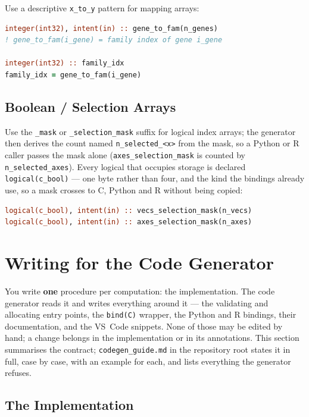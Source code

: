\documentclass{article}
\begin{document}
Use a descriptive \texttt{x\_to\_y} pattern for mapping arrays:

\begin{lstlisting}[language=Fortran]
integer(int32), intent(in) :: gene_to_fam(n_genes)
! gene_to_fam(i_gene) = family index of gene i_gene

integer(int32) :: family_idx
family_idx = gene_to_fam(i_gene)
\end{lstlisting}

\subsection{Boolean / Selection Arrays}

Use the \texttt{\_mask} or \texttt{\_selection\_mask} suffix for logical index arrays; the
generator then derives the count named \texttt{n\_selected\_<x>} from the mask, so a Python or R
caller passes the mask alone (\texttt{axes\_selection\_mask} is counted by
\texttt{n\_selected\_axes}). Every logical
that occupies storage is declared \texttt{logical(c\_bool)} --- one byte rather than four, and
the kind the bindings already use, so a mask crosses to C, Python and R without being copied:

\begin{lstlisting}[language=Fortran]
logical(c_bool), intent(in) :: vecs_selection_mask(n_vecs)
logical(c_bool), intent(in) :: axes_selection_mask(n_axes)
\end{lstlisting}

\section{Writing for the Code Generator}

You write \textbf{one} procedure per computation: the implementation. The code generator reads it
and writes everything around it — the validating and allocating entry points, the \texttt{bind(C)}
wrapper, the Python and R bindings, their documentation, and the VS~Code snippets. None of those
may be edited by hand; a change belongs in the implementation or in its annotations. This section
summarises the contract; \texttt{codegen\_guide.md} in the repository root states it in full, case
by case, with an example for each, and lists everything the generator refuses.

\subsection{The Implementation}
\end{document}
